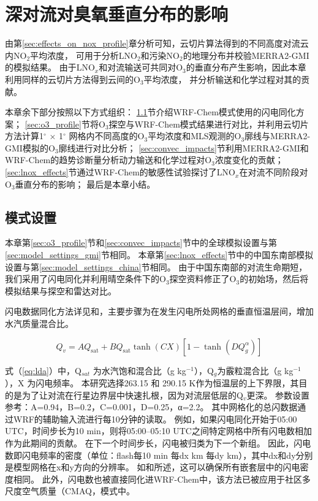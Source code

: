 
\chapter{深对流对臭氧垂直分布的影响}

由第\ref{sec:effects_on_nox_profile}章分析可知，云切片算法得到的不同高度对流云内NO$_2$平均浓度，
可用于分析LNO$_2$和污染NO$_2$的地理分布并校验MERRA2-GMI的模拟结果。
由于LNO$_x$和对流输送可共同对O$_3$的垂直分布产生影响，因此本章利用同样的云切片方法得到云间的O$_3$平均浓度，
并分析输送和化学过程对其的贡献。

本章余下部分按照以下方式组织：
\ref{sec:model_settings_assimilation}节介绍WRF-Chem模式使用的闪电同化方案；
\ref{sec:o3_profile}节将O$_3$探空与WRF-Chem模式结果进行对比，并利用云切片方法计算1$^{\circ}$ $\times$ 1$^{\circ}$ 网格内不同高度的O$_3$平均浓度和MLS观测的O$_3$廓线与MERRA2-GMI模拟的O$_3$廓线进行对比分析；
\ref{sec:convec_impacts}节利用MERRA2-GMI和WRF-Chem的趋势诊断量分析动力输送和化学过程对O$_3$浓度变化的贡献；
\ref{sec:lnox_effects}节通过WRF-Chem的敏感性试验探讨了LNO$_x$在对流不同阶段对O$_3$垂直分布的影响；
最后是本章小结。


\section{模式设置} \label{sec:model_settings_assimilation}

本章第\ref{sec:o3_profile}节和\ref{sec:convec_impacts}节中的全球模拟设置与第\ref{sec:model_settings_gmi}节相同。
本章第\ref{sec:lnox_effects}节中的中国东南部模拟设置与第\ref{sec:model_settings_china}节相同。
由于中国东南部的对流生命期短，我们采用了闪电同化并利用晴空条件下的O$_3$探空资料修正了O$_3$的初始场，然后将模拟结果与探空和雷达对比。

闪电数据同化方法详见\citet{Fierro.2012}和\citet{Li.2017b}，主要步骤为在发生闪电所处网格的垂直恒温层间，增加水汽质量混合比。

\begin{equation} \label{eq:lda}
Q_{v}=A Q_{\mathrm{sat}}+B Q_{\mathrm{sat}} \tanh (C X)\left[1-\tanh \left(D Q_{g}^{\alpha}\right)\right]
\end{equation}

式（\ref{eq:lda}）中，Q$_{sat}$ 为水汽饱和混合比（g kg$^{−1}$），Q$_g$为霰粒混合比（g kg$^{−1}$），X 为闪电频率。
本研究选择263.15 和 290.15 K作为恒温层的上下界限，其目的是为了让对流在行星边界层中快速扎根，因为对流层低层的Q$_v$更深\citep{Marchand.2014,Finney.2016,Li.2017b}。
参数设置参考\citet{Li.2017b}：A=0.94，B=0.2，C=0.001，D=0.25，α=2.2。
其中网格化的总闪数据通过WRF的辅助输入流进行每10分钟的读取。
例如，如果闪电同化开始于05:00 UTC，时间步长为10 min，则将05:00--05:10 UTC之间特定网格中所有闪电数相加作为此期间的贡献。
在下一个时间步长，闪电被归类为下一个新组。
因此，闪电数即闪电频率的密度（单位：flash每10 min 每dx km 每dy km），其中dx和dy分别是模型网格在x和y方向的分辨率。
如\citet{Fierro.2012}和\citet{Li.2017b}所述，这可以确保所有嵌套层中的闪电密度相同。
此外，闪电数也被直接同化进WRF-Chem中，该方法已被应用于社区多尺度空气质量（CMAQ，\citet{Kang.2019,Kang.2019a,Kang.2020}模式中。

